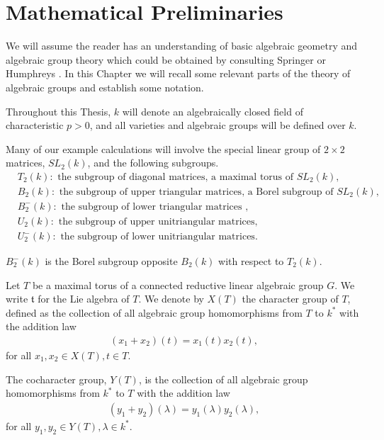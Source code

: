 
\chapter{Mathematical Preliminaries}
\label{Chapter2}

We will assume the reader has an understanding of basic algebraic geometry and algebraic group theory which could be obtained by consulting Springer \cite{springer2008linear} or Humphreys \cite{humphreys1975linear}. In this Chapter we will recall some relevant parts of the theory of algebraic groups and establish some notation.

Throughout this Thesis, $k$ will denote an algebraically closed field of characteristic $p>0$, and all varieties and algebraic groups will be defined over $k$.

Many of our example calculations will involve the special linear group of $2\times 2$ matrices, $SL_2(k)$, and the following subgroups.
\begin{align*}
	&T_2(k): \textrm{ the subgroup of diagonal matrices, a maximal torus of }SL_2(k),\\
	&B_2(k): \textrm{ the subgroup of upper triangular matrices, a Borel subgroup of }SL_2(k),\\
	&B^-_2(k): \textrm{ the subgroup of lower triangular matrices },\\
	&U_2(k): \textrm{ the subgroup of upper unitriangular matrices},\\
	&U^-_2(k): \textrm{ the subgroup of lower unitriangular matrices}.
\end{align*}

$B_2^-(k)$ is the Borel subgroup opposite $B_2(k)$ with respect to $T_2(k)$.

Let $T$ be a maximal torus of a connected reductive linear algebraic group $G$. We write $\mathfrak{t}$ for the Lie algebra of $T$. We denote by $X(T)$ the character group of $T$, defined as the collection of all algebraic group homomorphisms from $T$ to $k^*$ with the addition law
\begin{align*}
	(x_1 + x_2)(t) = x_1(t)x_2(t),
\end{align*}
for all $x_1, x_2\in X(T), t\in T$.

The cocharacter group, $Y(T)$, is the collection of all algebraic group homomorphisms from $k^*$ to $T$ with the addition law
\begin{align*}
	(y_1 + y_2)(\lambda) = y_1(\lambda)y_2(\lambda),
\end{align*}
for all $y_1, y_2\in Y(T), \lambda \in k^*$.

